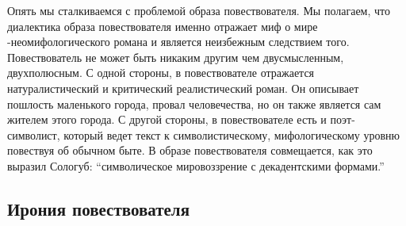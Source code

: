 \documentclass[12pt,a4paper]{article}
\begin{document}
Опять мы сталкиваемся с проблемой образа повествователя. Мы полагаем, что диалектика образа повествователя именно отражает миф о мире -неомифологического романа и является неизбежным следствием того. Повествователь не может быть никаким другим чем двусмысленным, двухполюсным. С одной стороны, в повествователе отражается натуралистический и критический реалистический роман. Он описывает пошлость маленького города, провал человечества, но он также является сам жителем этого города. С другой стороны, в повествователе есть и поэт-символист, который ведет текст к символистическому, мифологическому уровню повествуя об обычном быте. В образе повествователя совмещается, как это выразил Сологуб: \enquote{символическое мировоззрение с декадентскими формами.} %











\subsection{Ирония повествователя}


\end{document}
